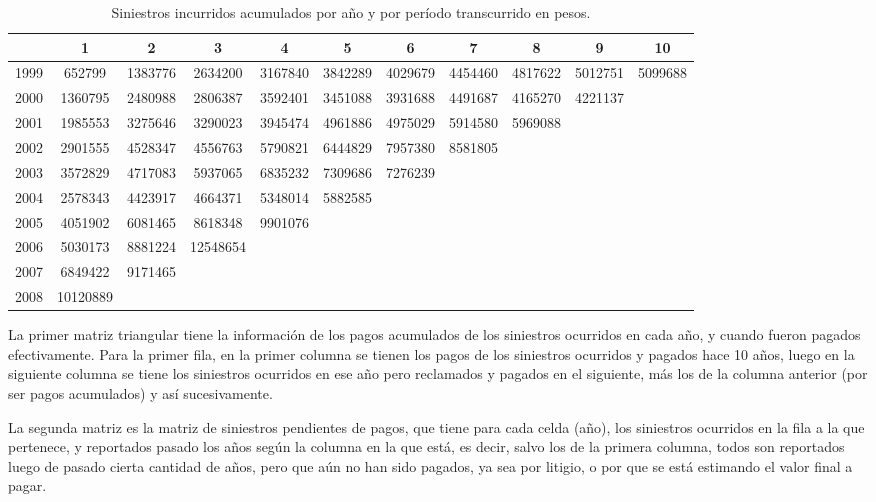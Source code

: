 \documentclass[
  12pt,
]{article}
\begin{document}
\begin{table}[ht]
\centering
\begingroup\fontsize{8.5pt}{10pt}\selectfont
\begin{tabular}{ccccccccccc}
  \hline
 & 1 & 2 & 3 & 4 & 5 & 6 & 7 & 8 & 9 & 10 \\ 
  \hline
1999 & 652799 & 1383776 & 2634200 & 3167840 & 3842289 & 4029679 & 4454460 & 4817622 & 5012751 & 5099688 \\ 
  2000 & 1360795 & 2480988 & 2806387 & 3592401 & 3451088 & 3931688 & 4491687 & 4165270 & 4221137 &  \\ 
  2001 & 1985553 & 3275646 & 3290023 & 3945474 & 4961886 & 4975029 & 5914580 & 5969088 &  &  \\ 
  2002 & 2901555 & 4528347 & 4556763 & 5790821 & 6444829 & 7957380 & 8581805 &  &  &  \\ 
  2003 & 3572829 & 4717083 & 5937065 & 6835232 & 7309686 & 7276239 &  &  &  &  \\ 
  2004 & 2578343 & 4423917 & 4664371 & 5348014 & 5882585 &  &  &  &  &  \\ 
  2005 & 4051902 & 6081465 & 8618348 & 9901076 &  &  &  &  &  &  \\ 
  2006 & 5030173 & 8881224 & 12548654 &  &  &  &  &  &  &  \\ 
  2007 & 6849422 & 9171465 &  &  &  &  &  &  &  &  \\ 
  2008 & 10120889 &  &  &  &  &  &  &  &  &  \\ 
   \hline
\end{tabular}
\endgroup
\caption{Siniestros incurridos acumulados por año y por período transcurrido en pesos.} 
\label{tabla1}
\end{table}

La primer matriz triangular tiene la información de los pagos acumulados
de los siniestros ocurridos en cada año, y cuando fueron pagados
efectivamente. Para la primer fila, en la primer columna se tienen los
pagos de los siniestros ocurridos y pagados hace 10 años, luego en la
siguiente columna se tiene los siniestros ocurridos en ese año pero
reclamados y pagados en el siguiente, más los de la columna anterior
(por ser pagos acumulados) y así sucesivamente.

La segunda matriz es la matriz de siniestros pendientes de pagos, que
tiene para cada celda (año), los siniestros ocurridos en la fila a la
que pertenece, y reportados pasado los años según la columna en la que
está, es decir, salvo los de la primera columna, todos son reportados
luego de pasado cierta cantidad de años, pero que aún no han sido
pagados, ya sea por litigio, o por que se está estimando el valor final
a pagar.
\end{document}
